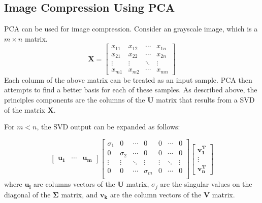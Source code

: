 \documentclass[conference]{IEEEtran}
\begin{document}
    \subsection{Image Compression Using PCA} \label{pca_section}
    	
    	PCA can be used for image compression. Consider an grayscale image, which is a $m \times n$ matrix. 
    	\begin{equation}
    		\mathbf{X} = \begin{bmatrix}
    			x_{11} & x_{12} & \cdots & x_{1n} \\
    			x_{21} & x_{22} & \cdots & x_{2n} \\
    			\vdots & \vdots & \ddots & \vdots \\
    			x_{m1} & x_{m2} & \cdots & x_{mn}
    		\end{bmatrix}    			
    	\end{equation}
    	Each column of the above matrix can be treated as an input sample. PCA then attempts to find a better basis for each of these samples. As described above, the principles components are the columns of the $\mathbf{U}$ matrix that results from a SVD of the matrix $\mathbf{X}$.
	
	For $m < n$, the SVD output can be expanded as follows:
	
	\begin{equation}
		\begin{bmatrix}
			\mathbf{u_1} & \cdots & \mathbf{u_m}
		\end{bmatrix}\begin{bmatrix}
			\sigma_1 & 0 & \cdots & 0 & 0 & \cdots & 0\\
			0 & \sigma_2 & \cdots & 0 & 0 & \cdots & 0\\
			\vdots & \vdots & \ddots & \vdots & \vdots & \ddots & \vdots\\
			0 & 0 & \cdots & \sigma_m & 0 & \cdots & 0\\		
		\end{bmatrix}\begin{bmatrix}
			\mathbf{v_{1}^{T}}\\
			\vdots\\
			\mathbf{v_{n}^{T}}
		\end{bmatrix}		
	\end{equation}
	where $\mathbf{u_i}$ are columns vectors of the $\mathbf{U}$ matrix, $\sigma_j$ are the singular values on the diagonal of the $\mathbf{\Sigma}$ matrix, and $\mathbf{v_k}$ are the column vectors of the $\mathbf{V}$ matrix.
	  
\end{document}
